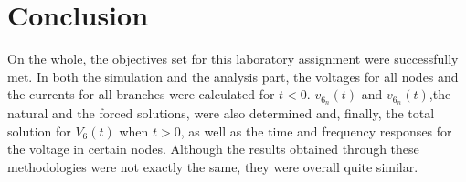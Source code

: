 
\section{Conclusion}
\label{sec:conclusion}

On the whole, the objectives set for this laboratory assignment were successfully met.
In both the simulation and the analysis part, the voltages for all nodes and the currents for all branches were calculated for $t<0$. $v_{6_n}(t)$ and $v_{6_n}(t)$,the natural and the forced solutions, were also determined and, finally, the total solution for $V_6(t)$ when $t>0$, as well as the time and frequency responses for the voltage in certain nodes. Although the results obtained through these methodologies were not exactly the same, they were overall quite similar.



